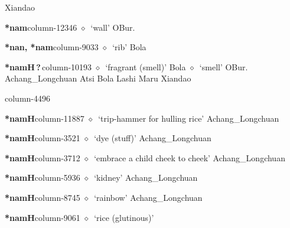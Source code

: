          Xiandao 
  \item {\footnotesize \textbf{*nam}}{\tiny column-12346}
         $\diamond$~`wall'
         OBur. 
  \item {\footnotesize \textbf{*nan, *nam}}{\tiny column-9033}
         $\diamond$~`rib'
         Bola 
  \item {\footnotesize \textbf{*namH\,?\,}}{\tiny column-10193}
         $\diamond$~`fragrant (smell)'
         Bola 
\hspace{1ex}
         $\diamond$~`smell'
         OBur. 
\hspace{1ex}
         Achang\_Longchuan 
\hspace{1ex}
         Atsi 
\hspace{1ex}
         Bola 
\hspace{1ex}
         Lashi 
\hspace{1ex}
         Maru 
\hspace{1ex}
         Xiandao 
  \item {\footnotesize \textbf{}}{\tiny column-4496}
  \item {\footnotesize \textbf{*namH}}{\tiny column-11887}
         $\diamond$~`trip-hammer for hulling rice'
         Achang\_Longchuan 
  \item {\footnotesize \textbf{*namH}}{\tiny column-3521}
         $\diamond$~`dye (stuff)'
         Achang\_Longchuan 
  \item {\footnotesize \textbf{*namH}}{\tiny column-3712}
         $\diamond$~`embrace a child cheek to cheek'
         Achang\_Longchuan 
  \item {\footnotesize \textbf{*namH}}{\tiny column-5936}
         $\diamond$~`kidney'
         Achang\_Longchuan 
  \item {\footnotesize \textbf{*namH}}{\tiny column-8745}
         $\diamond$~`rainbow'
         Achang\_Longchuan 
  \item {\footnotesize \textbf{*namH}}{\tiny column-9061}
         $\diamond$~`rice (glutinous)'
